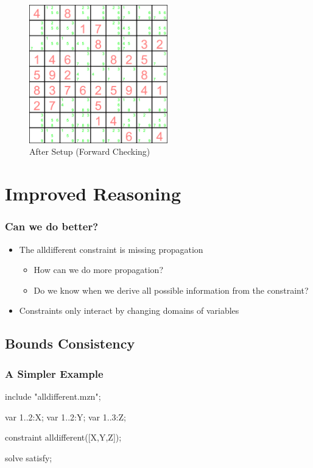 \begin{figure}[ht]
\caption{\label{sudoku:aftersetupfc}After Setup (Forward Checking)}
\begin{center}
\includegraphics[width=6cm]{../sudoku/FC/frame29}
\end{center}
\end{figure}

\clearpage
\section{Improved Reasoning}

\begin{frame}
\frametitle{Can we do better?}
\begin{itemize}
\item The alldifferent constraint is missing propagation
\begin{itemize}
\item How can we do more propagation?
\item Do we know when we derive all possible information from the constraint?
\end{itemize}
\item Constraints only interact by changing domains of variables
\end{itemize}
\end{frame}

\subsection{Bounds Consistency}

\begin{frame}[fragile]
\frametitle{A Simpler Example}
\begin{semiverbatim}
include "alldifferent.mzn";

var 1..2:X;
var 1..2:Y;
var 1..3:Z;

constraint alldifferent([X,Y,Z]);

solve satisfy;
\end{semiverbatim}
\end{frame}

